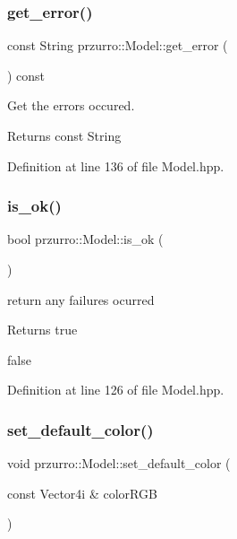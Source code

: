\subsubsection{\texorpdfstring{get\_error()}{get\_error()}}
{\footnotesize\ttfamily const String przurro\+::\+Model\+::get\+\_\+error (\begin{DoxyParamCaption}{ }\end{DoxyParamCaption}) const\hspace{0.3cm}{\ttfamily [inline]}}



Get the errors occured. 

\begin{DoxyReturn}{Returns}
const String 
\end{DoxyReturn}


Definition at line 136 of file Model.\+hpp.

\mbox{\label{classprzurro_1_1_model_a8dbadcaf39085757731d023247a79ec0}} 
\subsubsection{\texorpdfstring{is\_ok()}{is\_ok()}}
{\footnotesize\ttfamily bool przurro\+::\+Model\+::is\+\_\+ok (\begin{DoxyParamCaption}{ }\end{DoxyParamCaption})\hspace{0.3cm}{\ttfamily [inline]}}



return any failures ocurred 

\begin{DoxyReturn}{Returns}
true 

false 
\end{DoxyReturn}


Definition at line 126 of file Model.\+hpp.

\mbox{\label{classprzurro_1_1_model_a378be42503fd1bb19f286616fce4274f}} 
\subsubsection{\texorpdfstring{set\_default\_color()}{set\_default\_color()}}
{\footnotesize\ttfamily void przurro\+::\+Model\+::set\+\_\+default\+\_\+color (\begin{DoxyParamCaption}\item[{const Vector4i \&}]{color\+R\+GB }\end{DoxyParamCaption})}



